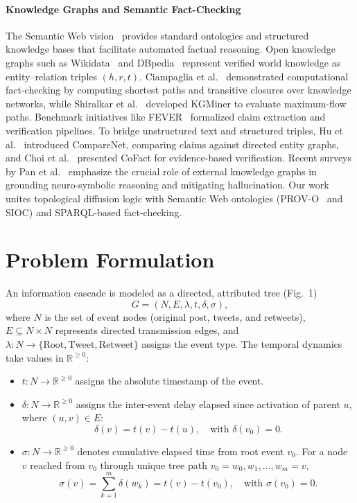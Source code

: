 \documentclass[10pt,twocolumn,a4paper]{article}
\begin{document}
\paragraph{Knowledge Graphs and Semantic Fact-Checking}
The Semantic Web vision~\cite{berners2001} provides standard ontologies and structured knowledge bases that facilitate automated factual reasoning. Open knowledge graphs such as Wikidata~\cite{vrandecic2014} and DBpedia~\cite{lehmann2015} represent verified world knowledge as entity--relation triples $(h,r,t)$. Ciampaglia et al.~\cite{ciampaglia2015} demonstrated computational fact-checking by computing shortest paths and transitive closures over knowledge networks, while Shiralkar et al.~\cite{shiralkar2017kgminer} developed KGMiner to evaluate maximum-flow paths. Benchmark initiatives like FEVER~\cite{thorne2018fever} formalized claim extraction and verification pipelines. To bridge unstructured text and structured triples, Hu et al.~\cite{hu2021comparenet} introduced CompareNet, comparing claims against directed entity graphs, and Choi et al.~\cite{choi2021cofact} presented CoFact for evidence-based verification. Recent surveys by Pan et al.~\cite{pan2024unifying} emphasize the crucial role of external knowledge graphs in grounding neuro-symbolic reasoning and mitigating hallucination. Our work unites topological diffusion logic with Semantic Web ontologies (PROV-O~\cite{lebo2013} and SIOC) and SPARQL-based fact-checking.

\section{Problem Formulation}
An information cascade is modeled as a directed, attributed tree (Fig.~1)
\begin{equation}
G = (N, E, \lambda, t, \delta, \sigma),
\end{equation}
where $N$ is the set of event nodes (original post, tweets, and retweets), $E \subseteq N \times N$ represents directed transmission edges, and $\lambda : N \to \{\mathrm{Root}, \mathrm{Tweet}, \mathrm{Retweet}\}$ assigns the event type. The temporal dynamics take values in $\mathbb{R}^{\ge 0}$:
\begin{itemize}
  \item $t : N \to \mathbb{R}^{\ge 0}$ assigns the absolute timestamp of the event.
  \item $\delta : N \to \mathbb{R}^{\ge 0}$ assigns the inter-event delay elapsed since activation of parent $u$, where $(u,v)\in E$:
  \begin{equation}
  \delta(v) = t(v) - t(u), \quad \text{with } \delta(v_0) = 0.
  \end{equation}
  \item $\sigma : N \to \mathbb{R}^{\ge 0}$ denotes cumulative elapsed time from root event $v_0$. For a node $v$ reached from $v_0$ through unique tree path $v_0 = w_0, w_1, \dots, w_m = v$,
  \begin{equation}
  \sigma(v) = \sum_{k=1}^{m} \delta(w_k) = t(v) - t(v_0), \quad \text{with } \sigma(v_0) = 0.
  \end{equation}
\end{itemize}
 
\end{document}

